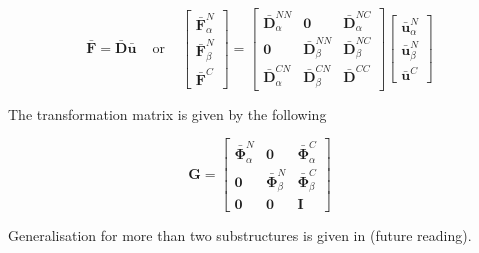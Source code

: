 \documentclass[../DomainDecomposition.tex]{subfiles}
\begin{document}
\begin{equation}
    \bar{\mathbf{F}}
    =
    \bar{\mathbf{D}} 
    \bar{\mathbf{u}} 
    \phantom{xx} 
    \text{or}
    \phantom{xx} 
    \begin{bmatrix}
        \bar{\mathbf{F}}_{\alpha}^{N} \\ 
        \bar{\mathbf{F}}_{\beta}^{N} \\ 
        \bar{\mathbf{F}}^{C} 
    \end{bmatrix}
    =
    \begin{bmatrix}
        \bar{\mathbf{D}}_{\alpha}^{NN} & 
        \mathbf{0} & 
        \bar{\mathbf{D}}_{\alpha}^{NC} \\ 
        \mathbf{0} & 
        \bar{\mathbf{D}}_{\beta}^{NN} & 
        \bar{\mathbf{D}}_{\beta}^{NC} \\ 
        \bar{\mathbf{D}}_{\alpha}^{CN} & 
        \bar{\mathbf{D}}_{\beta}^{CN} & 
        \bar{\mathbf{D}}^{CC} 
    \end{bmatrix}
    \begin{bmatrix}
        \bar{\mathbf{u}}_{\alpha}^{N} \\ 
        \bar{\mathbf{u}}_{\beta}^{N} \\ 
        \bar{\mathbf{u}}^{C} 
    \end{bmatrix}
\end{equation}

The transformation matrix is given by the following 

\begin{equation}
    \mathbf{G} 
    = 
    \begin{bmatrix}
        \bar{\mathbf{\Phi}}_{\alpha}^{N} & 
        \mathbf{0} & 
        \bar{\mathbf{\Phi}}_{\alpha}^{C} \\
        \mathbf{0} & 
        \bar{\mathbf{\Phi}}_{\beta}^{N} & 
        \bar{\mathbf{\Phi}}_{\beta}^{C} \\
        \mathbf{0} & 
        \mathbf{0} & 
        \mathbf{I} 
    \end{bmatrix}
\end{equation}

Generalisation for more than two substructures is given in \cite{chatterjee2020uncertainty} (future reading). 
\end{document}

